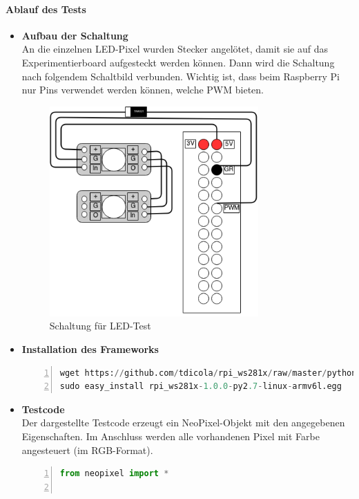 \paragraph{Ablauf des Tests}
\begin{itemize}

\item \textbf{Aufbau der Schaltung}\\
An die einzelnen LED-Pixel wurden Stecker angelötet, damit sie auf das Experimentierboard aufgesteckt werden können. Dann wird die Schaltung nach folgendem Schaltbild verbunden. Wichtig ist, dass beim Raspberry Pi nur Pins verwendet werden können, welche PWM bieten. \\
\begin{figure}[h]
\begin{minipage}{\textwidth}
            \centering
            \includegraphics[width=8cm]{./data/TestSchaltungLED.png}
            \caption{Schaltung für LED-Test}
        \end{minipage}
\end{figure}

\clearpage
\pagebreak

\item \textbf{Installation des Frameworks} 
\begin{lstlisting}[caption = Installation Framework ws281x, language=Python, frame=single, breaklines=true,columns=fullflexible, commentstyle=\color{gray}\upshape, captionpos=b, numbers = left]
wget https://github.com/tdicola/rpi_ws281x/raw/master/python/dist/rpi_ws281x-1.0.0-py2.7-linux-armv6l.egg 
sudo easy_install rpi_ws281x-1.0.0-py2.7-linux-armv6l.egg
\end{lstlisting}
\item \textbf{Testcode} \\
Der dargestellte Testcode erzeugt ein NeoPixel-Objekt mit den angegebenen Eigenschaften. Im Anschluss werden alle vorhandenen Pixel mit Farbe angesteuert (im RGB-Format).
\begin{lstlisting}[caption = Testcode zur Ansteuerung der LEDs, language=python, frame=single, breaklines=true,columns=fullflexible, commentstyle=\color{gray}\upshape, captionpos=b, numbers = left]
from neopixel import * 
	

\end{lstlisting}
\end{itemize}
